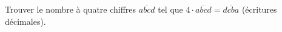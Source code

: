 Trouver le nombre à quatre chiffres $\overline{abcd}$ tel que $4 \cdot \overline{abcd} = \overline{dcba}$ (écritures décimales).
